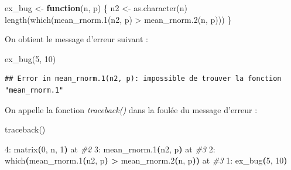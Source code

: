 \documentclass[
]{book}
\newenvironment{Shaded}{\begin{snugshade}}{\end{snugshade}}
\newcommand{\CommentTok}[1]{\textcolor[rgb]{0.56,0.35,0.01}{\textit{#1}}}
\newcommand{\ControlFlowTok}[1]{\textcolor[rgb]{0.13,0.29,0.53}{\textbf{#1}}}
\newcommand{\DecValTok}[1]{\textcolor[rgb]{0.00,0.00,0.81}{#1}}
\newcommand{\ErrorTok}[1]{\textcolor[rgb]{0.64,0.00,0.00}{\textbf{#1}}}
\newcommand{\ExtensionTok}[1]{#1}
\newcommand{\FunctionTok}[1]{\textcolor[rgb]{0.00,0.00,0.00}{#1}}
\newcommand{\KeywordTok}[1]{\textcolor[rgb]{0.13,0.29,0.53}{\textbf{#1}}}
\newcommand{\NormalTok}[1]{#1}
\newcommand{\OperatorTok}[1]{\textcolor[rgb]{0.81,0.36,0.00}{\textbf{#1}}}
\newcommand{\OtherTok}[1]{\textcolor[rgb]{0.56,0.35,0.01}{#1}}
\newcommand{\SpecialCharTok}[1]{\textcolor[rgb]{0.00,0.00,0.00}{#1}}
\theoremstyle{definition}
\theoremstyle{definition}
\theoremstyle{definition}
\theoremstyle{definition}
\theoremstyle{remark}
\begin{document}
\begin{Shaded}
\begin{Highlighting}[]
\NormalTok{ex\_bug }\OtherTok{\textless{}{-}} \ControlFlowTok{function}\NormalTok{(n, p) \{}
\NormalTok{  n2 }\OtherTok{\textless{}{-}} \FunctionTok{as.character}\NormalTok{(n)}
  \FunctionTok{length}\NormalTok{(}\FunctionTok{which}\NormalTok{(}\FunctionTok{mean\_rnorm.1}\NormalTok{(n2, p) }\SpecialCharTok{\textgreater{}} \FunctionTok{mean\_rnorm.2}\NormalTok{(n, p)))}
\NormalTok{\}}
\end{Highlighting}
\end{Shaded}

On obtient le message d'erreur suivant :

\begin{Shaded}
\begin{Highlighting}[]
\FunctionTok{ex\_bug}\NormalTok{(}\DecValTok{5}\NormalTok{, }\DecValTok{10}\NormalTok{)}
\end{Highlighting}
\end{Shaded}

\begin{verbatim}
## Error in mean_rnorm.1(n2, p): impossible de trouver la fonction "mean_rnorm.1"
\end{verbatim}

On appelle la fonction \emph{traceback()} dans la foulée du message d'erreur :

\begin{Shaded}
\begin{Highlighting}[]
\FunctionTok{traceback}\NormalTok{()}
\end{Highlighting}
\end{Shaded}

\begin{Shaded}
\begin{Highlighting}[]
\ExtensionTok{4:}\NormalTok{ matrix}\ErrorTok{(}\ExtensionTok{0,}\NormalTok{ n, 1}\KeywordTok{)} \ExtensionTok{at} \CommentTok{\#2}
\ExtensionTok{3:}\NormalTok{ mean\_rnorm.1}\ErrorTok{(}\ExtensionTok{n2,}\NormalTok{ p}\KeywordTok{)} \ExtensionTok{at} \CommentTok{\#3}
\ExtensionTok{2:}\NormalTok{ which}\ErrorTok{(}\ExtensionTok{mean\_rnorm.1}\ErrorTok{(}\ExtensionTok{n2,}\NormalTok{ p}\KeywordTok{)} \OperatorTok{\textgreater{}}\NormalTok{ mean\_rnorm.2}\KeywordTok{(}\ExtensionTok{n,}\NormalTok{ p}\KeywordTok{))} \ExtensionTok{at} \CommentTok{\#3}
\ExtensionTok{1:}\NormalTok{ ex\_bug}\ErrorTok{(}\ExtensionTok{5,}\NormalTok{ 10}\KeywordTok{)}
\end{Highlighting}
\end{Shaded}
\end{document}
